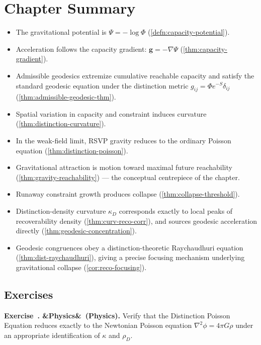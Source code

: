 \documentclass[12pt,twoside,openright]{book}
\newenvironment{chapsummary}{%
  \begin{tcolorbox}[colback=DistBlue!5,colframe=DistBlue,
    title={\faBookOpen\enspace Summary},
    fonttitle=\sffamily\bfseries\color{white},
    attach boxed title to top left={yshift=-2mm,xshift=4mm},
    boxed title style={colback=DistBlue,rounded corners}]
  \begin{itemize}[nosep,leftmargin=*]}{%
  \end{itemize}\end{tcolorbox}}
\newcounter{exercise}[chapter]
\newenvironment{exercise}[1][]{%
  \refstepcounter{exercise}%
  \noindent\textbf{\sffamily\color{DistBlue}%
  Exercise~\thechapter.\theexercise%
  \ifx&#1&\else~(#1)\fi.}\enspace}{\par\medskip}
\begin{document}
\section*{Chapter Summary}
\begin{chapsummary}
  \item The gravitational potential is
        $\Psi = -\log\Phi$ (\cref{defn:capacity-potential}).
  \item Acceleration follows the capacity gradient:
        $\mathbf{g} = -\nabla\Psi$
        (\cref{thm:capacity-gradient}).
  \item Admissible geodesics extremize cumulative reachable
        capacity and satisfy the standard geodesic equation
        under the distinction metric $g_{ij} = \Phi e^{-S}\delta_{ij}$
        (\cref{thm:admissible-geodesic-thm}).
  \item Spatial variation in capacity and constraint
        induces curvature (\cref{thm:distinction-curvature}).
  \item In the weak-field limit, RSVP gravity reduces to
        the ordinary Poisson equation
        (\cref{thm:distinction-poisson}).
  \item Gravitational attraction is motion toward maximal
        future reachability
        (\cref{thm:gravity-reachability}) ---
        the conceptual centrepiece of the chapter.
  \item Runaway constraint growth produces collapse
        (\cref{thm:collapse-threshold}).
  \item Distinction-density curvature $\kappa_D$
        corresponds exactly to local peaks of recoverability
        density (\cref{thm:curv-reco-corr}), and sources
        geodesic acceleration directly
        (\cref{thm:geodesic-concentration}).
  \item Geodesic congruences obey a distinction-theoretic
        Raychaudhuri equation
        (\cref{thm:dist-raychaudhuri}), giving a precise
        focusing mechanism underlying gravitational collapse
        (\cref{cor:reco-focusing}).
\end{chapsummary}

\subsection*{Exercises}

\begin{exercise}[Physics]
  Verify that the Distinction Poisson Equation reduces
  exactly to the Newtonian Poisson equation
  $\nabla^2\phi = 4\pi G\rho$ under an appropriate
  identification of $\kappa$ and $\rho_D$.
\end{exercise}
\end{document}
